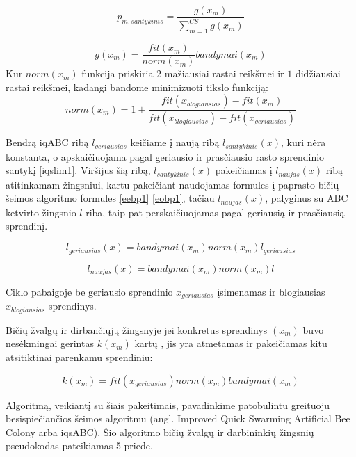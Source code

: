 \documentclass{VUMIFKompMagistrinis}
\begin{document}
\begin{equation}\label{iqsobp}
p_{m, santykinis}=\frac{g(x_m)}{\sum_{m=1}^{CS}{g(x_m)}}
\end{equation}

\begin{equation}\label{iqsobp2}
g(x_m)=\frac{fit(x_{m})}{norm(x_{m})}bandymai(x_{m})
\end{equation}
Kur $norm(x_{m})$ funkcija priskiria $2$ mažiausiai rastai reikšmei ir $1$ didžiausiai rastai reikšmei, kadangi bandome minimizuoti tikslo funkciją:
\begin{equation}\label{iqsobp3}
        norm(x_{m}) = 1 + \frac{fit(x_{blogiausias})-fit(x_{m})}{fit(x_{blogiausias})-fit(x_{geriausias})}
\end{equation}

Bendrą iqABC ribą $l_{geriausias}$ keičiame į naują ribą $l_{santykinis}(x)$, kuri nėra konstanta, o apskaičiuojama pagal geriausio ir prasčiausio rasto sprendinio santykį \eqref{iqslim1}. Viršijus šią ribą, $l_{santykinis}(x)$ pakeičiamas į $l_{naujas}(x)$ ribą atitinkamam žingsniui, kartu pakeičiant naudojamas formules į paprasto bičių šeimos algoritmo formules \eqref{eebp1} \eqref{eobp1}, tačiau $l_{naujas}(x)$, palyginus su ABC ketvirto žingsnio $l$ riba, taip pat perskaičiuojamas pagal geriausią ir prasčiausią sprendinį. 

\begin{equation}\label{iqslim1}
        l_{geriausias}(x)=bandymai(x_{m})norm(x_{m})l_{geriausias}
\end{equation}

\begin{equation}\label{iqslim2}
        l_{naujas}(x)=bandymai(x_{m})norm(x_{m})l
\end{equation}

Ciklo pabaigoje be geriausio sprendinio  $x_{geriausias}$ įsimenamas ir blogiausias $x_{blogiausias}$ sprendinys.





Bičių žvalgų ir dirbančiųjų žingsnyje jei konkretus sprendinys $(x_m)$ buvo nesėkmingai gerintas $k(x_m)$ kartų , jis yra atmetamas ir pakeičiamas kitu atsitiktinai parenkamu sprendiniu:

\begin{equation}\label{iqssp}
k(x_m) = fit(x_{geriausias})norm(x_{m}){bandymai(x_m)}
\end{equation}


Algoritmą, veikiantį su šiais pakeitimais, pavadinkime patobulintu greituoju besispiečiančios šeimos algoritmu (angl. Improved Quick Swarming Artificial Bee Colony arba iqsABC). Šio algoritmo bičių žvalgų ir darbininkių žingsnių pseudokodas pateikiamas 5 priede.
\end{document}
